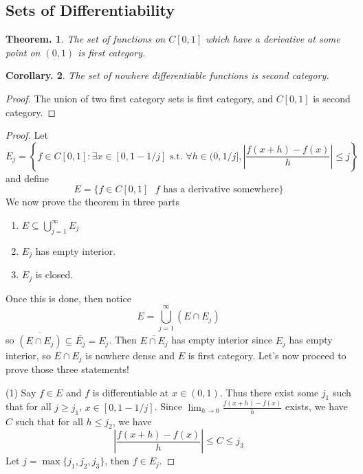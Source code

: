 \documentclass[11pt, a4paper]{memoir}
\theoremstyle{change}
\newtheorem{theorem}{Theorem.}[section]
\newtheorem{corollary}[theorem]{Corollary.}
\theoremstyle{plain}
\theoremstyle{nonumberplain}
\newtheorem{proof}{Proof}
\numberwithin{equation}{section}
\begin{document}
\subsection{Sets of Differentiability}
\begin{theorem}
    The set of functions on $C[0,1]$ which have a derivative at some point on $(0,1)$ is first category.
\end{theorem}
\begin{corollary}
    The set of nowhere differentiable functions is second category.
\end{corollary}
\begin{proof}
    The union of two first category sets is first category, and $C[0,1]$ is second category.
\end{proof}
\begin{proof}
    Let
    \[E_j = \left\{f\in C[0,1]:\exists x\in[0,1-1/j]\text{ s.t. }\forall h\in(0,1/j],\left\lvert\frac{f(x+h)-f(x)}{h}\right\rvert\leq j\right\}\]
    and define
    \[E=\{f\in C[0,1]\text{ $f$ has a derivative somewhere}\}\]
    We now prove the theorem in three parts
    \begin{enumerate}
        \item $E\subseteq\bigcup_{j=1}^\infty E_j$
        \item $E_j$ has empty interior.
        \item $E_j$ is closed.
    \end{enumerate}
    Once this is done, then notice
    \[E=\bigcup\limits_{j=1}^\infty (E\cap E_j)\]
    so $\overline{(E\cap E_j)}\subseteq\overline{E_j}=E_j$.
    Then $\overline{E\cap E_j}$ has empty interior since $E_j$ has empty interior, so $E\cap E_j$ is nowhere dense and $E$ is first category.
    Let's now proceed to prove those three statements!

    (1) Say $f\in E$ and $f$ is differentiable at $x\in(0,1)$.
    Thus there exist some $j_1$ such that for all $j\geq j_1$, $x\in[0,1-1/j]$.
    Since $\lim_{h\to 0}\frac{f(x+h)-f(x)}{h}$ exists, we have $C$ such that for all $h\leq j_2$, we have
    \[\left\lvert\frac{f(x+h)-f(x)}{h}\right\rvert\leq C\leq j_3\]
    Let $j=\max\{j_1,j_2,j_3\}$, then $f\in E_j$.


\end{proof}
\end{document}
